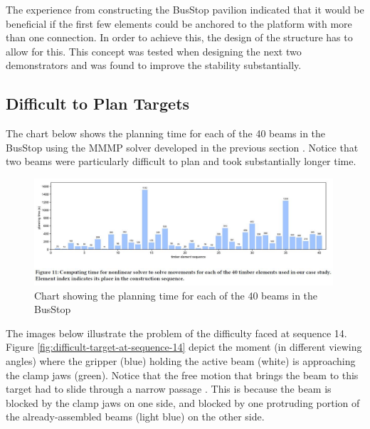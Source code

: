 The experience from constructing the BusStop pavilion indicated that it would be beneficial if the first few elements could be anchored to the platform with more than one connection. In order to achieve this, the design of the structure has to allow for this. This concept was tested when designing the next two demonstrators and was found to improve the stability substantially.

\subsection{Difficult to Plan Targets}
\label{subsection:exploration-3-difficult-to-plan-targets}

The chart below \parencite{huangNewAnalogProtocol2021} shows the planning time for each of the 40 beams in the BusStop using the MMMP solver developed in the previous section . Notice that two beams were particularly difficult to plan and took substantially longer time.

\begin{figure}[!h]
    \centering
    \includegraphics[width=0.99\textwidth]{images/6b/img18.jpg}
    \caption{Chart showing the planning time for each of the 40 beams in the BusStop}
    \label{fig:planning-time-for-each-beam}
\end{figure}

The images below illustrate the problem of the difficulty faced at sequence 14. Figure \ref{fig:difficult-target-at-sequence-14} depict the moment (in different viewing angles) where the gripper (blue) holding the active beam (white) is approaching the clamp jaws (green). Notice that the free motion that brings the beam to this target had to slide through a narrow passage . This is because the beam is blocked by the clamp jaws on one side, and blocked by one protruding portion of the already-assembled beams (light blue) on the other side.

